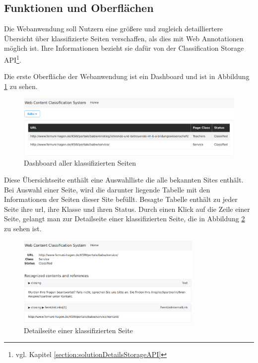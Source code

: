 \subsection{Funktionen und Oberflächen}
    \label{section:solutionDetailsWebAppFunctions}
    Die Webanwendung soll Nutzern eine größere und zugleich detailliertere
    Übersicht über klassifizierte Seiten verschaffen,
    als dies mit Web Annotationen möglich ist.
    Ihre Informationen bezieht sie dafür von der
    Classification Storage API\footnote{vgl. Kapitel \ref{section:solutionDetailsStorageAPI}}.

    Die erste Oberfläche der Webanwendung ist ein Dashboard
    und ist in Abbildung \ref{image:webAppDashboard} zu sehen.

    \begin{figure}[htb]
        \centering
        \includegraphics[width=\textwidth]{../resources/web-app/dashboard.png}
        \caption{Dashboard aller klassifizierten Seiten}
        \label{image:webAppDashboard}
    \end{figure}

    Diese Übersichtseite enthält eine Auswahlliste die alle bekannten Sites enthält.
    Bei Auswahl einer Seite, wird die darunter liegende Tabelle mit den Informationen
    der Seiten dieser Site befüllt.
    Besagte Tabelle enthält zu jeder Seite ihre \gls{url}, ihre Klasse und ihren Status.
    Durch einen Klick auf die Zeile einer Seite,
    gelangt man zur Detailseite einer klassifizierten Seite,
    die in Abbildung \ref{image:webAppDetailPage} zu sehen ist.

    \begin{figure}[htb]
        \centering
        \includegraphics[width=0.8\textwidth]{../resources/web-app/detail-page.png}
        \caption{Detailseite einer klassifizierten Seite}
        \label{image:webAppDetailPage}
    \end{figure}

